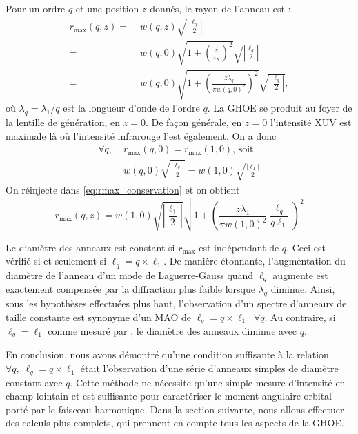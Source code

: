 Pour un ordre $q$ et une position $z$ donnés, le rayon de l'anneau est :
\begin{align}
{r_{{\mathrm{max}}}}\left( {q,z} \right) =& \;w\left( {q,z} \right)\sqrt {\left| {\frac{{{\ell _q}}}{2}} \right|} \nonumber\\ 
=& \;w\left( {q,0} \right)\sqrt {1 + {{\left( {\frac{z}{z_R}} \right)}^2}} \sqrt {\left| {\frac{{{\ell _q}}}{2}} \right|} \nonumber\\
=& \;w\left( {q,0} \right)\sqrt {1 + {{\left( {\frac{{z\lambda _q}}{{{\pi w{{\left( {{q},0} \right)}^2}}}}} \right)}^2}} \sqrt {\left| {\frac{{{\ell _q}}}{2}} \right|},
\label{eq:rmax_conservation}
\end{align}
où ${\lambda _q} = {\lambda _1}/q$ est la longueur d'onde de l'ordre $q$. La GHOE se produit au foyer de la lentille de génération, en $z=0$. De façon générale, en $z=0$ l'intensité XUV est maximale là où l'intensité infrarouge l'est également. On a donc
\begin{align*}
\forall q,\;&{r_{{\mathrm{max}}}}\left( {q,0} \right)={r_{{\mathrm{max}}}}\left( {1,0} \right) \text{, soit }\\
&w\left( {{q},0} \right)\sqrt {\frac{{|{\ell _q}|}}{2}}  = w\left( {{1},0} \right)\sqrt {\frac{{|{\ell _1}|}}{2}}
\end{align*}
On réinjecte dans \ref{eq:rmax_conservation} et on obtient
\begin{equation*}
{r_{{\mathrm{max}}}}\left( {q,z} \right) = w\left( {{1},0} \right)\sqrt {\left| {\frac{{{\ell _1}}}{2}} \right|}\sqrt {1 + {{\left( {\frac{{{z\lambda_1}}}{\pi w{{\left( {{1},0} \right)}^2}}\frac{\ell _q}{q{\ell _1}}}\right)}^2}} 
\end{equation*}

Le diamètre des anneaux est constant si ${r_{{\mathrm{max}}}}$ est indépendant de $q$. Ceci est vérifié si et seulement si $\ell _q=q\times\ell_1$. De manière étonnante, l'augmentation du diamètre de l'anneau d'un mode de Laguerre-Gauss quand $\ell_q$ augmente est exactement compensée par la diffraction plus faible lorsque $\lambda_q$ diminue. Ainsi, sous les hypothèses effectuées plus haut, l'observation d'un spectre d'anneaux de taille constante est synonyme d'un MAO de $\ell_q=q\times\ell_1\;\;\forall q$. Au contraire, si $\ell_q = \ell_1$ comme mesuré par , le diamètre des anneaux diminue avec $q$. 

En conclusion, nous avons démontré qu'une condition suffisante à la relation $\forall q,\; \ell_q = q\times\ell_1$ était l'observation d'une série d'anneaux simples de diamètre constant avec $q$. Cette méthode ne nécessite qu'une simple mesure d'intensité en champ lointain et est suffisante pour caractériser le moment angulaire orbital porté par le faisceau harmonique. Dans la section suivante, nous allons effectuer des calculs plus complets, qui prennent en compte tous les aspects de la GHOE.

